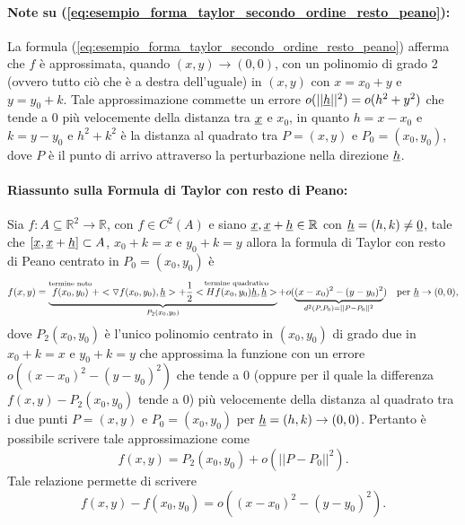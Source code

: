 \paragraph{Note su (\ref{eq:esempio_forma_taylor_secondo_ordine_resto_peano}):} La formula (\ref{eq:esempio_forma_taylor_secondo_ordine_resto_peano}) afferma che $f$ è approssimata, quando $(x,y)\rightarrow(0,0)$, con un polinomio di grado 2 (ovvero tutto ciò che è a destra dell'uguale) in $(x,y)$ con $x=x_0+y$ e $y=y_0+k$. Tale approssimazione commette un errore $o(||\uline h||^2) = o(h^2 + y^2)$ che tende a 0 più velocemente della distanza tra $\uline x$ e $x_0$, in quanto $h = x-x_0$ e $k=y - y_0$ e $h^2+ k^2$ è la distanza al quadrato tra $P=(x,y)$ e $P_0=(x_0, y_0)$, dove $P$ è il punto di arrivo attraverso la perturbazione nella direzione $\uline h$.

\paragraph{Riassunto sulla Formula di Taylor con resto di Peano:} Sia $f:A\subseteq\mathbb{R}^2\rightarrow\mathbb{R}$, con $f\in C^2(A)$ e siano $\uline x, \uline x+\uline h\in\mathbb{R}$ con $\uline h=(h,k)\neq\uline 0$, tale che $[\uline x, \uline x+\uline h] \subset A$, $x_0+k=x$ e $y_0+k=y$ allora la formula di Taylor con resto di Peano centrato in $P_0=(x_0,y_0)$ è
\begin{equation*}
	f(x,y) = \underbrace{\overset{\text{termine noto}}{f(x_0,y_0)} +  <\triangledown f(x_0,y_0), \uline h> + \frac{1}{2}\overset{\text{termine quadratico}}{<Hf(x_0,y_0)\uline h, \uline h>}}_{P_2(x_0,y_0)} + o(\underbrace{(x-x_0)^2-(y-y_0)^2}_{d^2(P,P_0)=||P-P_0||^2}) \quad\text{per } \uline h\rightarrow(0,0),
\end{equation*}
dove $P_2(x_0,y_0)$ è l'unico polinomio centrato in $(x_0,y_0)$ di grado due in $x_0+k=x$ e $y_0+k=y$ che approssima la funzione con un errore $o((x-x_0)^2-(y-y_0)^2)$ che tende a 0 (oppure per il quale la differenza $f(x,y)-P_2(x_0,y_0)$ tende a 0) più velocemente della distanza al quadrato tra i due punti $P=(x,y)$ e $P_0=(x_0,y_0)$ per $\uline h=(h,k)\rightarrow(0,0)$. Pertanto è possibile scrivere tale approssimazione come
\begin{equation*}
	f(x,y) = P_2(x_0,y_0) + o(||P-P_0||^2).
\end{equation*}
Tale relazione permette di scrivere
\begin{equation*}
	f(x,y) - f(x_0, y_0) = o((x-x_0)^2-(y-y_0)^2). 
\end{equation*}

